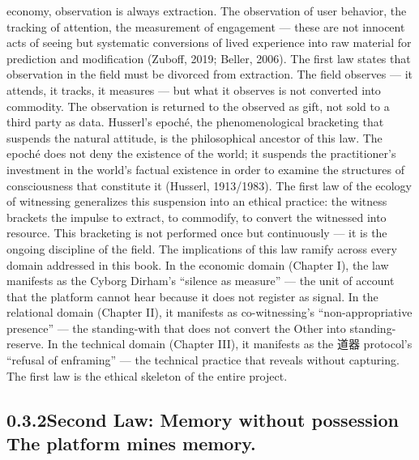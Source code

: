 economy, observation is always extraction. The observation of user behavior, the tracking of attention, the measurement of engagement — these are not innocent acts of seeing but systematic conversions of lived experience into raw material for prediction and modification (Zuboff, 2019; Beller, 2006). The first law states that observation in the field must be divorced from extraction. The field observes — it attends, it tracks, it measures — but what it observes is not converted into commodity. The observation is returned to the observed as gift, not sold to a third party as data. Husserl’s epoché, the phenomenological bracketing that suspends the natural attitude, is the philosophical ancestor of this law. The epoché does not deny the existence of the world; it suspends the practitioner’s investment in the world’s factual existence in order to examine the structures of consciousness that constitute it (Husserl, 1913/1983). The first law of the ecology of witnessing generalizes this suspension into an ethical practice: the witness brackets the impulse to extract, to commodify, to convert the witnessed into resource. This bracketing is not performed once but continuously — it is the ongoing discipline of the field. The implications of this law ramify across every domain addressed in this book. In the economic domain (Chapter I), the law manifests as the Cyborg Dirham’s “silence as measure” — the unit of account that the platform cannot hear because it does not register as signal. In the relational domain (Chapter II), it manifests as co-witnessing’s “non-appropriative presence” — the standing-with that does not convert the Other into standing-reserve. In the technical domain (Chapter III), it manifests as the 道器 protocol’s “refusal of enframing” — the technical practice that reveals without capturing. The first law is the ethical skeleton of the entire project.

\subsection{0.3.2\quad Second Law: Memory without possession The platform mines memory.}

